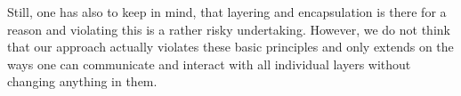 Still, one has also to keep in mind, that layering and encapsulation is there for a reason and violating this is a rather risky undertaking. However, we do not think that our approach actually violates these basic principles and only extends on the ways one can communicate and interact with all individual layers without changing anything in them.



		


